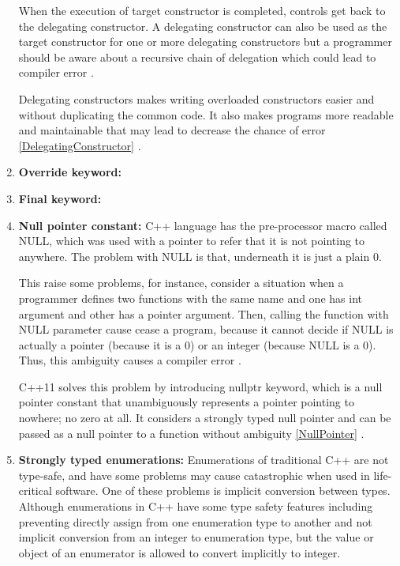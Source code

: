 \documentclass[11pt]{report}
\begin{document}
\begin{enumerate}
When the execution of target constructor is completed, controls get back to the delegating constructor. A delegating constructor can also be used as the target constructor for one or more delegating constructors but a programmer should be aware about a recursive chain of delegation which could lead to compiler error \cite{Overland:2011:CWF}.
\newline

Delegating constructors makes writing overloaded constructors easier and without duplicating the common code. It also makes programs more readable and maintainable that may lead to decrease the chance of error \ref{DelegatingConstructor} \cite{Overland:2011:CWF}.

\item \textbf{Override keyword:}
\item \textbf{Final keyword:}

\item \textbf{Null pointer constant:} C++ language has the pre-processor macro called NULL, which was used with a pointer to refer that it is not pointing to anywhere. The problem with NULL is that, underneath it is just a plain 0. 
\newline

This raise some problems, for instance, consider a situation when a programmer defines two functions with the same name and one has int argument and other has a pointer argument. Then, calling the function with NULL parameter cause cease a program, because it cannot decide if NULL is actually a pointer (because it is a 0) or an integer (because NULL is a 0). Thus, this ambiguity causes a compiler error \cite{Cppreference:2012:Cpp11}.
\newline

C++11 solves this problem by introducing nullptr keyword, which is a null pointer constant that unambiguously represents a pointer pointing to nowhere; no zero at all. It considers a strongly typed null pointer and can be passed as a null pointer to a function without ambiguity \ref{NullPointer} \cite{Cppreference:2012:Cpp11}. 


\item \textbf{Strongly typed enumerations:} Enumerations of traditional C++ are not type-safe, and have some problems may cause catastrophic when used in life-critical software. One of these problems is implicit conversion between types. Although enumerations in C++ have some type safety features including preventing directly assign from one enumeration type to another and not implicit conversion from an integer to enumeration type, but the value or object of an enumerator is allowed to convert implicitly to integer.
\newline


\end{enumerate}
\end{document}
